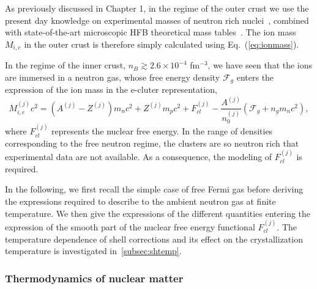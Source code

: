 As previously discussed in Chapter 1, in the regime of the outer crust we use 
the present day knowledge on experimental masses of neutron rich 
nuclei~\cite{Huang2017,Welker2017}, combined with state-of-the-art 
microscopic HFB theoretical mass tables~\cite{Goriely2013}. The ion mass 
$M_{i,e}$ in the outer crust is therefore simply calculated using 
Eq.~(\ref{eq:ionmass}).

In the regime of the inner crust, $n_B \gtrsim 2.6 \times 10^{-4}$ fm$^{-3}$, 
we have seen that the ions are immersed in a neutron gas, whose free energy 
density $\mathcal{F}_g$ enters the expression of the ion mass in the e-cluter 
representation,
%
\begin{equation}
  M_{i,e}^{(j)} c^2 = (A^{(j)} - Z^{(j)})m_n c^2 + Z^{(j)} m_p c^2 
  + F_{cl}^{(j)} - \frac{A^{(j)}}{n_0^{(j)}}(\mathcal{F}_g + n_g m_n c^2),
\end{equation}
%
where $F_{cl}^{(j)}$ represents the nuclear free energy.
In the range of densities corresponding to the free neutron regime, the 
clusters are so neutron rich that experimental data are not available. As a 
consequence, the modeling of $F_{cl}^{(j)}$ is required.

In the following, we first recall the simple case of free Fermi gas before
deriving the expressions required to describe to the ambient neutron gas at 
finite temperature. 
We then give the expressions of the different quantities entering the 
expression of the smooth part of the nuclear free energy functional 
$F_{cl}^{(j)}$. The temperature dependence of shell corrections and its effect 
on the crystallization temperature is investigated in~\ref{subsec:shtemp}.

\subsubsection{Thermodynamics of nuclear matter}


